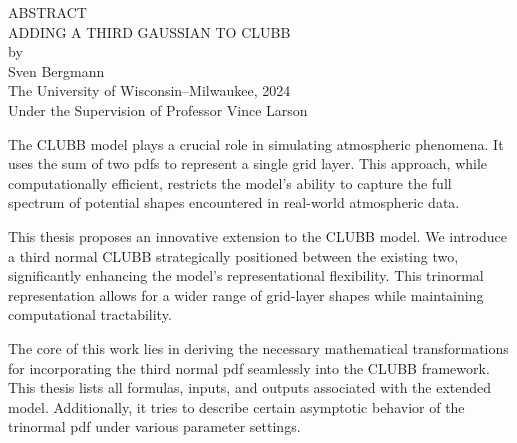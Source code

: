 \begin{center}
    ABSTRACT
    \\
    \singlespacing
    ADDING A THIRD GAUSSIAN TO CLUBB\\
    \doublespacing
    by\\
    Sven Bergmann\\
    \singlespacing
    The University of Wisconsin--Milwaukee, 2024\\
    Under the Supervision of Professor Vince Larson
\end{center}

The \gls{CLUBB} model plays a crucial role in simulating atmospheric phenomena.
It uses the sum of two \glspl{pdf} to represent a single grid layer.
This approach, while computationally efficient,
restricts the model's ability to capture the full spectrum of potential shapes encountered in real-world atmospheric data.

This thesis proposes an innovative extension to the \gls{CLUBB} model.
We introduce a third normal \gls{CLUBB} strategically positioned between the existing two,
significantly enhancing the model's representational flexibility.
This trinormal representation allows for a wider range of grid-layer shapes while maintaining computational tractability.

The core of this work lies in deriving the necessary mathematical transformations for incorporating the third normal \gls{pdf} seamlessly into the \gls{CLUBB} framework.
This thesis lists all formulas, inputs, and outputs associated with the extended model.
Additionally, it tries to describe certain asymptotic behavior of the trinormal pdf under various parameter settings.
